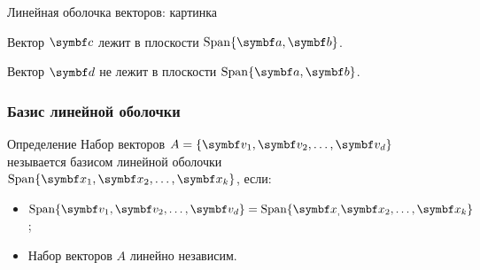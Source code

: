 \begin{frame}{Линейная оболочка векторов: картинка}
\begin{center}
  \end{center}
  
Вектор $\bc$ лежит в плоскости $\Span\{ \ba, \bb \}$.

Вектор $\bd$ не лежит в плоскости $\Span\{ \ba, \bb \}$.


\end{frame}



\begin{frame}
\frametitle{Базис линейной оболочки}


\begin{block}{Определение}
Набор векторов $A = \{\bv_1, \bv_2, \ldots, \bv_d \}$ незывается
\alert{базисом линейной оболочки} $\Span\{\bx_1, \bx_2, \ldots, \bx_k \}$,
если:
\begin{itemize}
  \item $\Span\{\bv_1, \bv_2, \ldots, \bv_d \} =  \Span\{\bx_, \bx_2, \ldots, \bx_k \}$;
  \item Набор векторов $A$ линейно независим.
\end{itemize}
\end{block}

\end{frame}





